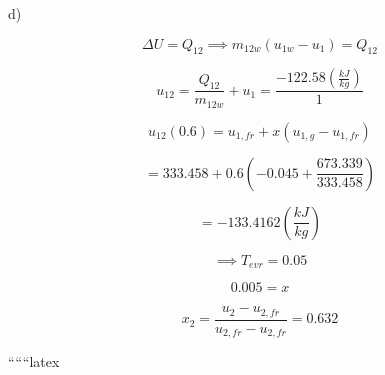 d)

\[
\Delta U = Q_{12} \implies m_{12w} (u_{1w} - u_{1}) = Q_{12}
\]

\[
u_{12} = \frac{Q_{12}}{m_{12w}} + u_{1} = \frac{-122.58 \left( \frac{kJ}{kg} \right)}{1}
\]

\[
u_{12}(0.6) = u_{1,fr} + x \left( u_{1,g} - u_{1,fr} \right)
\]

\[
= 333.458 + 0.6 \left( -0.045 + \frac{673.339}{333.458} \right)
\]

\[
= -133.4162 \left( \frac{kJ}{kg} \right)
\]

\[
\implies T_{evr} = 0.05
\]

\[
0.005 = x
\]

\[
x_2 = \frac{u_2 - u_{2,fr}}{u_{2,fr} - u_{2,fr}} = 0.632
\]

``````latex